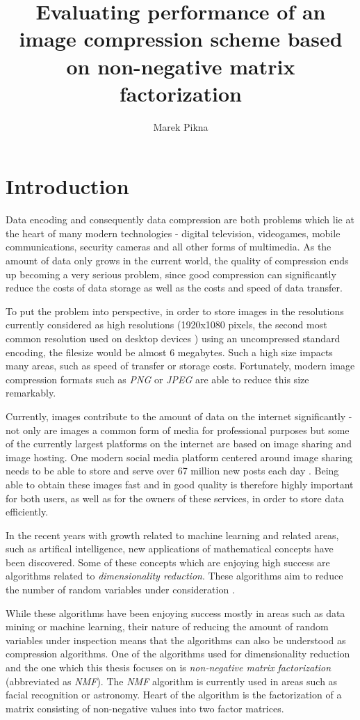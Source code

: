 \documentclass[thesis=M,english]{FITthesis}[2012/10/20]
\title{Evaluating performance of an image compression scheme based on non-negative matrix factorization}
\author{Marek Pikna} %
\begin{document}

\chapter{Introduction}
Data encoding and consequently data compression are both problems which lie
at the heart of many modern technologies - digital television, videogames, mobile
communications, security cameras and all other forms of multimedia. As the amount
of data only grows in the current world, the quality of
compression ends up becoming a very serious problem, since good compression can
significantly reduce the costs of data storage as well as the costs and speed
of data transfer.

To put the problem into perspective, in order to store images in the resolutions
currently considered as high resolutions (1920x1080 pixels, the second most common
resolution used on desktop devices \cite{res-stats}) using an uncompressed
standard encoding, the filesize would be almost 6 megabytes. Such a high size impacts
many areas, such as speed of transfer or storage costs. Fortunately, modern image compression
formats such as \emph{PNG} or \emph{JPEG} are able to reduce this size remarkably.

Currently, images contribute to the amount of data on the internet significantly - not only are images a common
form of media for professional purposes but some of the currently largest platforms on the
internet are based on image sharing and image hosting. One modern social media platform centered around image
sharing needs to be able to store and serve over 67 million new posts each day \cite{data-amount}.
Being able to obtain these images fast and in good quality is therefore highly important for both users, as
well as for the owners of these services, in order to store data efficiently.

In the recent years with growth related to machine learning and related areas, such as artifical
intelligence, new applications of mathematical concepts have been discovered. Some of these concepts
which are enjoying high success are algorithms related to \emph{dimensionality reduction}. These
algorithms aim to reduce the number of random variables under consideration \cite{dimens-reduction}.

While these algorithms have been enjoying success mostly in areas such as data mining or machine
learning, their nature of reducing the amount of random variables under inspection means that the
algorithms can also be understood as compression algorithms. One of the algorithms used for dimensionality
reduction and the one which this thesis focuses on is \emph{non-negative matrix factorization} (abbreviated
as \emph{NMF}). The \emph{NMF} algorithm is currently used in areas such as facial recognition or
astronomy. Heart of the algorithm is the factorization of a matrix consisting of non-negative values into
two factor matrices.
\end{document}
